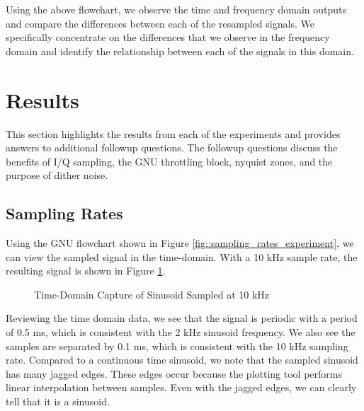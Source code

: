 \documentclass{article}
\begin{document}
Using the above flowchart, we observe the time and frequency domain outputs and compare the differences between each of the resampled signals. We specifically concentrate on the differences that we observe in the frequency domain and identify the relationship between each of the signals in this domain.

\section{Results}

This section highlights the results from each of the experiments and provides answers to additional followup questions. The followup questions discuss the benefits of I/Q sampling, the GNU throttling block, nyquist zones, and the purpose of dither noise.

\subsection{Sampling Rates}

Using the GNU flowchart shown in Figure \ref{fig::sampling_rates_experiment}, we can view the sampled signal in the time-domain. With a 10 kHz sample rate, the resulting signal is shown in Figure \ref{fig::sampling_rates_time_domain_10k_samp_rate}.

\begin{figure}[H]
	\centerline{}
	\caption{Time-Domain Capture of Sinusoid Sampled at 10 kHz}
	\label{fig::sampling_rates_time_domain_10k_samp_rate}
\end{figure}

Reviewing the time domain data, we see that the signal is periodic with a period of 0.5 ms, which is consistent with the 2 kHz sinusoid frequency. We also see the samples are separated by 0.1 ms, which is consistent with the 10 kHz sampling rate. Compared to a continuous time sinusoid, we note that the sampled sinusoid has many jagged edges. These edges occur because the plotting tool performs linear interpolation between samples. Even with the jagged edges, we can clearly tell that it is a sinusoid.
\end{document}
